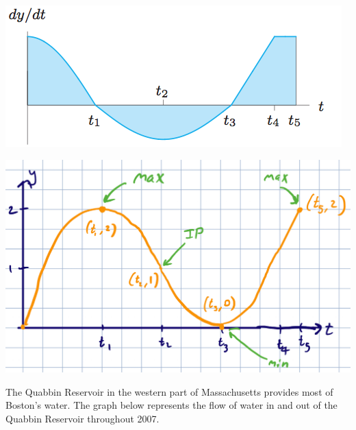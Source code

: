 \documentclass[11pt]{exam}
\begin{document}
\begin{questions}
  \begin{center}
    \includegraphics[scale=0.5]{Figures/no17}
  \end{center}
  \begin{solution}
    \begin{center}
      \includegraphics[scale=0.5]{Figures/5}
    \end{center}
  \end{solution}
\question The Quabbin Reservoir in the western part of Massachusetts
  provides most of Boston's water. The graph below represents the flow
  of water in and out of the Quabbin Reservoir throughout 2007.
\end{questions}
\end{document}
